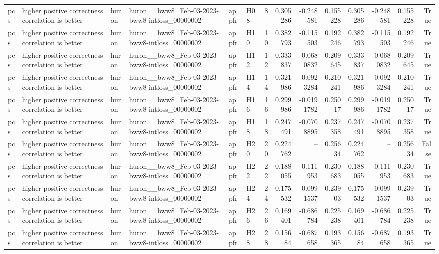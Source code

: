 \begin{longtable}{llllllrrrrrrrr}
pcs & higher positive correctness correlation is better & huron & huron\_\_bww8\_Feb-03-2023-bww8-intloss\_00000002 & appfr & H08 & 8 & 0.305286 & -0.248581 & 0.155228 & 0.305286 & -0.248581 & 0.155228 & True \\
pcs & higher positive correctness correlation is better & huron & huron\_\_bww8\_Feb-03-2023-bww8-intloss\_00000002 & appfr & H10 & 10 & 0.382793 & -0.115503 & 0.192246 & 0.382793 & -0.115503 & 0.192246 & True \\
pcs & higher positive correctness correlation is better & huron & huron\_\_bww8\_Feb-03-2023-bww8-intloss\_00000002 & appfr & H12 & 12 & 0.333837 & -0.0680832 & 0.209645 & 0.333837 & -0.0680832 & 0.209645 & True \\
pcs & higher positive correctness correlation is better & huron & huron\_\_bww8\_Feb-03-2023-bww8-intloss\_00000002 & appfr & H14 & 14 & 0.321986 & -0.0923284 & 0.210241 & 0.321986 & -0.0923284 & 0.210241 & True \\
pcs & higher positive correctness correlation is better & huron & huron\_\_bww8\_Feb-03-2023-bww8-intloss\_00000002 & appfr & H16 & 16 & 0.299986 & -0.0191782 & 0.25017 & 0.299986 & -0.0191782 & 0.25017 & True \\
pcs & higher positive correctness correlation is better & huron & huron\_\_bww8\_Feb-03-2023-bww8-intloss\_00000002 & appfr & H18 & 18 & 0.247491 & -0.0708895 & 0.237358 & 0.247491 & -0.0708895 & 0.237358 & True \\
pcs & higher positive correctness correlation is better & huron & huron\_\_bww8\_Feb-03-2023-bww8-intloss\_00000002 & appfr & H20 & 20 & 0.224762 & -- & 0.25634 & 0.224762 & -- & 0.25634 & False \\
pcs & higher positive correctness correlation is better & huron & huron\_\_bww8\_Feb-03-2023-bww8-intloss\_00000002 & appfr & H22 & 22 & 0.188055 & -0.111953 & 0.230683 & 0.188055 & -0.111953 & 0.230683 & True \\
pcs & higher positive correctness correlation is better & huron & huron\_\_bww8\_Feb-03-2023-bww8-intloss\_00000002 & appfr & H24 & 24 & 0.175532 & -0.0991537 & 0.23903 & 0.175532 & -0.0991537 & 0.23903 & True \\
pcs & higher positive correctness correlation is better & huron & huron\_\_bww8\_Feb-03-2023-bww8-intloss\_00000002 & appfr & H26 & 26 & 0.169401 & -0.686784 & 0.225238 & 0.169401 & -0.686784 & 0.225238 & True \\
pcs & higher positive correctness correlation is better & huron & huron\_\_bww8\_Feb-03-2023-bww8-intloss\_00000002 & appfr & H28 & 28 & 0.15684 & -0.687658 & 0.193365 & 0.15684 & -0.687658 & 0.193365 & True \\

\end{longtable}
